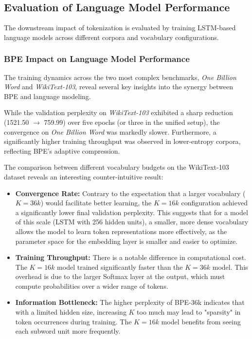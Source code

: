 \subsection{Evaluation of Language Model Performance}
The downstream impact of tokenization is evaluated by training LSTM-based language models across different corpora and vocabulary configurations.

\subsubsection{BPE Impact on Language Model Performance}
The training dynamics across the two most complex benchmarks, \textit{One Billion Word} and \textit{WikiText-103}, reveal several key insights into the synergy between BPE and language modeling.



While the validation perplexity on \textit{WikiText-103} exhibited a sharp reduction (1521.50 $\rightarrow$ 759.99) over five epochs (or three in the unified setup), the convergence on \textit{One Billion Word} was markedly slower. Furthermore, a significantly higher training throughput was observed in lower-entropy corpora, reflecting BPE's adaptive compression.



The comparison between different vocabulary budgets on the WikiText-103 dataset reveals an interesting counter-intuitive result:
\begin{itemize}
    \item \textbf{Convergence Rate:} Contrary to the expectation that a larger vocabulary ($K=36k$) would facilitate better learning, the $K=16k$ configuration achieved a significantly lower final validation perplexity. This suggests that for a model of this scale (LSTM with 256 hidden units), a smaller, more dense vocabulary allows the model to learn token representations more effectively, as the parameter space for the embedding layer is smaller and easier to optimize.
    \item \textbf{Training Throughput:} There is a notable difference in computational cost. The $K=16k$ model trained significantly faster than the $K=36k$ model. This overhead is due to the larger Softmax layer at the output, which must compute probabilities over a wider range of tokens.
    \item \textbf{Information Bottleneck:} The higher perplexity of BPE-36k indicates that with a limited hidden size, increasing $K$ too much may lead to "sparsity" in token occurrences during training. The $K=16k$ model benefits from seeing each subword unit more frequently.
\end{itemize}

